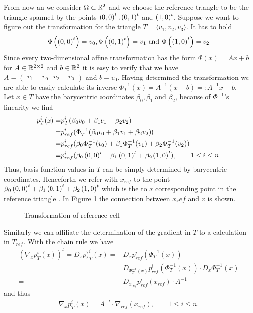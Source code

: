 \begin{example}
From now an we consider $\Omega \subset \mathbb{R}^2$ and we choose the reference triangle to be the triangle spanned by the points $\left( 0, 0\right)^t, \left( 0, 1\right)^t$ and $\left( 1, 0\right)^t$.
Suppose we want to figure out the transformation for the triangle $T = \langle v_1,v_2,v_3 \rangle$.
It has to hold
\[
\Phi\left(\left( 0, 0\right)^t\right) = v_0, \Phi\left(\left( 0, 1\right)^t\right) = v_1 \textnormal{ and } \Phi\left(\left( 1, 0\right)^t\right) = v_2
\]
Since every two-dimensional affine transformation has the form $\Phi(x) = Ax+b$ for $A \in \mathbb{R}^{2 \times 2}$ and $b \in \mathbb{R}^2$ it is easy to verify that we have $A = \begin{pmatrix} v_1-v_0 & v_2-v_0\end{pmatrix}$ and $b = v_0$.
Having determined the transformation we are able to easily calculate its inverse $\Phi_T^{-1}(x) = A^{-1} (x-b) =: A^{-1} x- \tilde b$. \\
Let $x \in T$ have the barycentric coordinates $\beta_0, \beta_1$ and $\beta_2$, because of $\Phi^{-1}$'s linearity we find
\begin{align*}
	p^i_T(x) =& p_T^i( \beta_0 v_0 +\beta_1 v_1 + \beta_2 v_2  ) \\
	=& p^i_{ref}(\Phi_T^{-1}(\beta_0 v_0 +\beta_1 v_1 + \beta_2 v_2)) \\
	=& p^i_{ref}(\beta_0 \Phi_T^{-1}(v_0) +\beta_1 \Phi_T^{-1}(v_1) + \beta_2 \Phi_T^{-1}(v_2)) \\
		=& p^i_{ref}(\beta_0 \left( 0, 0\right)^t +\beta_1 \left( 0, 1\right)^t + \beta_2 \left( 1, 0\right)^t ), \qquad 1 \leq i \leq n.
\end{align*}
Thus, basis function values in $T$ can be simply determined by barycentric coordinates. Henceforth we refer with $x_{ref}$  to the point $\beta_0 \left( 0, 0\right)^t +\beta_1 \left( 0, 1\right)^t + \beta_2 \left( 1, 0\right)^t$ which is the to $x$ corresponding point in the reference triangle . In Figure \ref{fig: transformation} the connection between $x_ref$ and $x$ is shown.

\begin{figure}[h]
	
	\caption{Transformation of reference cell}
	 \label{fig: transformation}
\end{figure}

Similarly we can affiliate the determination of the gradient in $T$ to a calculation in $T_{ref}$. With the chain rule we have
\begin{align*}
	\left(\nabla_x p_T^i(x)\right)^t = D_x p)_T^i(x) =& D_x p^i_{ref}(\Phi_T^{-1}(x)) \\
	  =& D_{\Phi_T^{-1}(x)}p^i_{ref}(\Phi_T^{-1}(x)) \cdot D_x  \Phi_T^{-1}(x) \\
	  =& D_{x_{ref}}p^i_{ref}(x_{ref}) \cdot  A^{-1}
\end{align*}
and thus
\begin{align}
	\nabla_x p_T^i(x) = A^{-t} \cdot \nabla_{ref}(x_{ref}), \qquad 1 \leq i \leq n.
\end{align}


\end{example}
